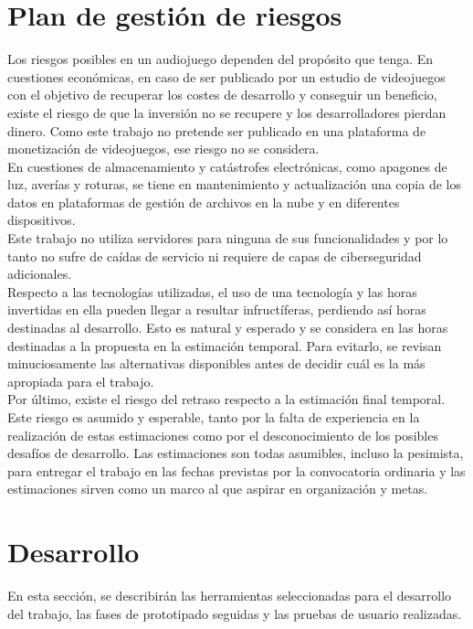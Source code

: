 \section{Plan de gestión de riesgos}
Los riesgos posibles en un audiojuego dependen del propósito que tenga. En cuestiones económicas, en caso de ser publicado por un estudio de videojuegos con el objetivo de recuperar los costes de desarrollo y conseguir un beneficio, existe el riesgo de que la inversión no se recupere y los desarrolladores pierdan dinero. Como este trabajo no pretende ser publicado en una plataforma de monetización de videojuegos, ese riesgo no se considera.\\

En cuestiones de almacenamiento y catástrofes electrónicas, como apagones de luz, averías y roturas, se tiene en mantenimiento y actualización una copia de los datos en plataformas de gestión de archivos en la nube y en diferentes dispositivos.\\

Este trabajo no utiliza servidores para ninguna de sus funcionalidades y por lo tanto no sufre de caídas de servicio ni requiere de capas de ciberseguridad adicionales.\\

Respecto a las tecnologías utilizadas, el uso de una tecnología y las horas invertidas en ella pueden llegar a resultar infructíferas, perdiendo así horas destinadas al desarrollo. Esto es natural y esperado y se considera en las horas destinadas a la propuesta en la estimación temporal. Para evitarlo, se revisan minuciosamente las alternativas disponibles antes de decidir cuál es la más apropiada para el trabajo.\\

Por último, existe el riesgo del retraso respecto a la estimación final temporal. Este riesgo es asumido y esperable, tanto por la falta de experiencia en la realización de estas estimaciones como por el desconocimiento de los posibles desafíos de desarrollo. Las estimaciones son todas asumibles, incluso la pesimista, para entregar el trabajo en las fechas previstas por la convocatoria ordinaria y las estimaciones sirven como un marco al que aspirar en organización y metas.\\

\section{Desarrollo}
En esta sección, se describirán las herramientas seleccionadas para el desarrollo del trabajo, las fases de prototipado seguidas y las pruebas de usuario realizadas.

